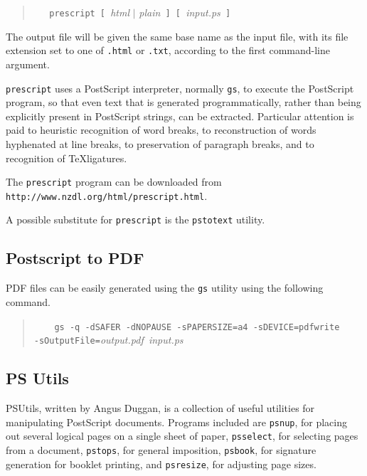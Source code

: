 \documentclass[twoside,11pt]{article}
\newcommand{\htmladdnormallink}[2]{#1}
\newcommand{\htmlref}[2]{#1}
\newcommand{\xlabel}[1]{}
\begin{document}
\begin{quote}
\verb+   prescript [ +{\em html} $\mid$ {\em plain}\verb+ ] [ +{\em input.ps}\verb+ ]+
\end{quote}

The output file will be given the same base name as the input file, with its file extension set to one of {\tt .html} or {\tt .txt}, according to the first command-line argument. 

{\tt prescript} uses a PostScript interpreter, normally \htmlref{{\tt gs}}{sc15_gs}, to execute the PostScript program, so that even text that is generated programmatically, rather than being explicitly present in PostScript strings, can be extracted. Particular attention is paid to heuristic recognition of word breaks, to reconstruction of words hyphenated at line breaks, to preservation of paragraph breaks, and to recognition of \TeX ligatures. 

The {\tt prescript} program can be downloaded from \htmladdnormallink{{\tt http://www.nzdl.org/html/prescript.html}}{http://www.nzdl.org/html/prescript.html}.

A possible substitute for {\tt prescript} is the \htmladdnormallink{{\tt pstotext}}{http://www.research.digital.com/SRC/virtualpaper/pstotext.html} utility.  

\subsection{\xlabel{sc15_pstopdf}Postscript to PDF\label{sc15_pstopdf}}

PDF files can be easily generated using the \htmlref{{\tt gs}}{sc15_gs} utility using the following command.

\begin{quote}
\verb+    gs -q -dSAFER -dNOPAUSE -sPAPERSIZE=a4 -sDEVICE=pdfwrite+\linebreak
\verb+       -sOutputFile=+{\em output.pdf}\verb+ +{\em input.ps}
\end{quote}

\subsection{\xlabel{sc15_pstools}PS Utils\label{sc15_pstools}}

\htmladdnormallink{PSUtils}{http://www.dcs.ed.ac.uk/home/ajcd/psutils/index.html}, written by Angus Duggan, is a collection of useful utilities for manipulating PostScript documents. Programs included are {\tt psnup}, for placing out several logical pages on a single sheet of paper, {\tt psselect}, for selecting pages from a document, {\tt pstops}, for general imposition, {\tt psbook}, for signature generation for booklet printing, and {\tt psresize}, for adjusting page sizes. 
\end{document}
